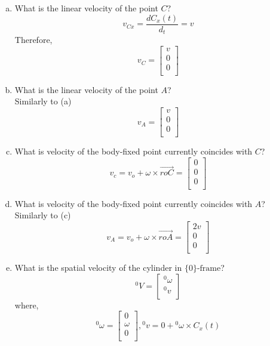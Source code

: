 \begin{enumerate}[(a)]
    \item What is the linear velocity of the point \(C\)?\\
    \[v_{Cx} = \frac{dC_x(t)}{d_t} = v\]
    Therefore,
    \[v_C = \begin{bmatrix}
        v \\ 0 \\ 0 \\
    \end{bmatrix}\]
    \item What is the linear velocity of the point $A$?\\
    Similarly to (a)\[v_A = \begin{bmatrix}
        v \\ 0 \\ 0 \\
    \end{bmatrix}\]
    \item What is velocity of the body-fixed point currently coincides with $C$?\\
    \[v_c = v_o + \omega \times \overrightarrow{roC} = \begin{bmatrix}
        0 \\ 0 \\ 0 \\
    \end{bmatrix}\]
    \item What is velocity of the body-fixed point currently coincides with $A$?\\
    Similarly to (c)\[v_A = v_o + \omega \times \overrightarrow{roA} = \begin{bmatrix}
        2v \\ 0 \\ 0 \\
    \end{bmatrix}\]
    \item What is the spatial velocity of the cylinder in $\text{\{0\}-frame}$?\\
    \[{}^0V = \begin{bmatrix}
        {}^0\omega \\ {}^0v \\ 
    \end{bmatrix}\]
    where,\[{}^0\omega = \begin{bmatrix}
        0 \\ \omega \\ 0 \\
    \end{bmatrix}, {}^0v = 0 + {}^0\omega \times  C_x(t)\]

\end{enumerate}
